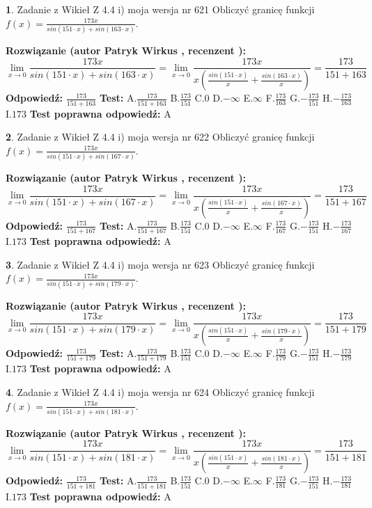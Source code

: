 \documentclass[12pt, a4paper]{article}
\theoremstyle{definition} %
\newtheorem{zad}{}
\newcommand{\zadStart}[1]{\begin{zad}#1\newline}
\newcommand{\zadStop}{\end{zad}}
\newcommand{\rozwStart}[2]{\noindent \textbf{Rozwiązanie (autor #1 , recenzent #2): }\newline}
\newcommand{\rozwStop}{\newline}
\newcommand{\odpStart}{\noindent \textbf{Odpowiedź:}\newline}
\newcommand{\odpStop}{\newline}
\newcommand{\testStart}{\noindent \textbf{Test:}\newline}
\newcommand{\testStop}{\newline}
\newcommand{\kluczStart}{\noindent \textbf{Test poprawna odpowiedź:}\newline}
\newcommand{\kluczStop}{\newline}
\begin{document}
\zadStart{Zadanie z Wikieł Z 4.4 i) moja wersja nr 621}
Obliczyć granicę funkcji $f(x)=\frac{173x}{sin(151\cdot x) +sin(163\cdot x)}$.
\zadStop
\rozwStart{Patryk Wirkus}{}
$$\lim\limits_{x\to 0}\frac{173x}{sin(151\cdot x) +sin(163\cdot x)}=\lim\limits_{x\to 0}\frac{173x}{x(\frac{sin(151\cdot x)}{x}+\frac{sin(163\cdot x)}{x})}=\frac{173}{151+163}$$
\rozwStop
\odpStart
$\frac{173}{151+163}$
\odpStop
\testStart
A.$\frac{173}{151+163}$
B.$\frac{173}{151}$
C.$0$
D.$-\infty$
E.$\infty$
F.$\frac{173}{163}$
G.$-\frac{173}{151}$
H.$-\frac{173}{163}$
I.$173$
\testStop
\kluczStart
A
\kluczStop



\zadStart{Zadanie z Wikieł Z 4.4 i) moja wersja nr 622}
Obliczyć granicę funkcji $f(x)=\frac{173x}{sin(151\cdot x) +sin(167\cdot x)}$.
\zadStop
\rozwStart{Patryk Wirkus}{}
$$\lim\limits_{x\to 0}\frac{173x}{sin(151\cdot x) +sin(167\cdot x)}=\lim\limits_{x\to 0}\frac{173x}{x(\frac{sin(151\cdot x)}{x}+\frac{sin(167\cdot x)}{x})}=\frac{173}{151+167}$$
\rozwStop
\odpStart
$\frac{173}{151+167}$
\odpStop
\testStart
A.$\frac{173}{151+167}$
B.$\frac{173}{151}$
C.$0$
D.$-\infty$
E.$\infty$
F.$\frac{173}{167}$
G.$-\frac{173}{151}$
H.$-\frac{173}{167}$
I.$173$
\testStop
\kluczStart
A
\kluczStop



\zadStart{Zadanie z Wikieł Z 4.4 i) moja wersja nr 623}
Obliczyć granicę funkcji $f(x)=\frac{173x}{sin(151\cdot x) +sin(179\cdot x)}$.
\zadStop
\rozwStart{Patryk Wirkus}{}
$$\lim\limits_{x\to 0}\frac{173x}{sin(151\cdot x) +sin(179\cdot x)}=\lim\limits_{x\to 0}\frac{173x}{x(\frac{sin(151\cdot x)}{x}+\frac{sin(179\cdot x)}{x})}=\frac{173}{151+179}$$
\rozwStop
\odpStart
$\frac{173}{151+179}$
\odpStop
\testStart
A.$\frac{173}{151+179}$
B.$\frac{173}{151}$
C.$0$
D.$-\infty$
E.$\infty$
F.$\frac{173}{179}$
G.$-\frac{173}{151}$
H.$-\frac{173}{179}$
I.$173$
\testStop
\kluczStart
A
\kluczStop



\zadStart{Zadanie z Wikieł Z 4.4 i) moja wersja nr 624}
Obliczyć granicę funkcji $f(x)=\frac{173x}{sin(151\cdot x) +sin(181\cdot x)}$.
\zadStop
\rozwStart{Patryk Wirkus}{}
$$\lim\limits_{x\to 0}\frac{173x}{sin(151\cdot x) +sin(181\cdot x)}=\lim\limits_{x\to 0}\frac{173x}{x(\frac{sin(151\cdot x)}{x}+\frac{sin(181\cdot x)}{x})}=\frac{173}{151+181}$$
\rozwStop
\odpStart
$\frac{173}{151+181}$
\odpStop
\testStart
A.$\frac{173}{151+181}$
B.$\frac{173}{151}$
C.$0$
D.$-\infty$
E.$\infty$
F.$\frac{173}{181}$
G.$-\frac{173}{151}$
H.$-\frac{173}{181}$
I.$173$
\testStop
\kluczStart
A
\kluczStop
\end{document}
